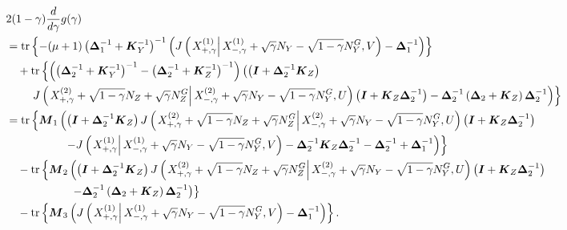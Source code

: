 \documentclass[journal,final, onecolumn]{IEEEtran}
\DeclareMathOperator{\tr}{tr}
\begin{document}
\begin{align}
& 2(1-\gamma) \frac{d}{d\gamma}g(\gamma)\nonumber \\
&= \tr \left\{  -(\mu+1) \left( \boldsymbol{\Delta}^{-1}_{1} + \boldsymbol{K}^{-1}_{Y}  \right)^{-1}\left(  J \left(  \left. X^{(1)}_{+, \gamma}  \right| X^{(1)}_{-, \gamma}+\sqrt{\gamma}N_{Y} - \sqrt{1-\gamma}N_{Y}^{G}, V  \right) - \boldsymbol{\Delta}^{-1}_{1}  \right)           \right\} \\
& \quad +\tr \left\{   \left(      \left( \boldsymbol{\Delta}^{-1}_{2} + \boldsymbol{K}^{-1}_{Y}  \right)^{-1} - \left( \boldsymbol{\Delta}^{-1}_{2} + \boldsymbol{K}^{-1}_{Z}  \right)^{-1}        \right)\left(\left( \boldsymbol{I} + \boldsymbol{\Delta}^{-1}_{2}\boldsymbol{K}_{Z}  \right)\right.\right.\nonumber \\
& \qquad   \left.\left.J\left( \left.X^{(2)}_{+, \gamma}+\sqrt{1-\gamma}N_{Z}+ \sqrt{\gamma}N_{Z}^{G} \right|X^{(2)}_{-, \gamma}+\sqrt{\gamma}N_{Y} - \sqrt{1-\gamma}N_{Y}^{G}, U \right)\left( \boldsymbol{I} + \boldsymbol{K}_{Z}\boldsymbol{\Delta}^{-1}_{2}  \right)-\boldsymbol{\Delta}_{2}^{-1}\left( \boldsymbol{\Delta}_{2} + \boldsymbol{K}_{Z}  \right)\boldsymbol{\Delta}_{2}^{-1} \right)        \right\} \\
&=\tr \left\{   \boldsymbol{M}_{1}\left(\left( \boldsymbol{I} + \boldsymbol{\Delta}^{-1}_{2}\boldsymbol{K}_{Z}  \right) J\left( \left.X^{(2)}_{+, \gamma}+\sqrt{1-\gamma}N_{Z}+ \sqrt{\gamma}N_{Z}^{G} \right|X^{(2)}_{-, \gamma}+\sqrt{\gamma}N_{Y} - \sqrt{1-\gamma}N_{Y}^{G}, U \right)\left( \boldsymbol{I} + \boldsymbol{K}_{Z}\boldsymbol{\Delta}^{-1}_{2}  \right)\right.\right.\nonumber \\
& \hspace{0.7in} \left.\left. -  J \left(  \left. X^{(1)}_{+, \gamma}  \right| X^{(1)}_{-, \gamma}+\sqrt{\gamma}N_{Y} - \sqrt{1-\gamma}N_{Y}^{G}, V  \right) -\boldsymbol{\Delta}_{2}^{-1}\boldsymbol{K}_{Z}\boldsymbol{\Delta}_{2}^{-1}- \boldsymbol{\Delta}_{2}^{-1} + \boldsymbol{\Delta}_{1}^{-1}\right)        \right\} \label{eq:te1}\\
& \quad - \tr \left\{   \boldsymbol{M}_{2}\left(\left( \boldsymbol{I} + \boldsymbol{\Delta}^{-1}_{2}\boldsymbol{K}_{Z}  \right)J\left( \left.X^{(2)}_{+, \gamma}+\sqrt{1-\gamma}N_{Z}+ \sqrt{\gamma}N_{Z}^{G} \right|X^{(2)}_{-, \gamma}+\sqrt{\gamma}N_{Y} - \sqrt{1-\gamma}N_{Y}^{G}, U \right)\left( \boldsymbol{I} + \boldsymbol{K}_{Z}\boldsymbol{\Delta}^{-1}_{2}  \right)\right.\right.\nonumber \\
& \hspace{0.5in} \qquad   \left.\left.-\boldsymbol{\Delta}_{2}^{-1}\left( \boldsymbol{\Delta}_{2} + \boldsymbol{K}_{Z}  \right)\boldsymbol{\Delta}_{2}^{-1} \right)        \right\} \label{eq:te2}\\
& \quad -\tr \left\{   \boldsymbol{M}_{3}\left(  J \left(  \left. X^{(1)}_{+, \gamma}  \right| X^{(1)}_{-, \gamma}+\sqrt{\gamma}N_{Y} - \sqrt{1-\gamma}N_{Y}^{G}, V  \right) - \boldsymbol{\Delta}^{-1}_{1}  \right)           \right\} \label{eq:te3}.
\end{align}
\end{document}
